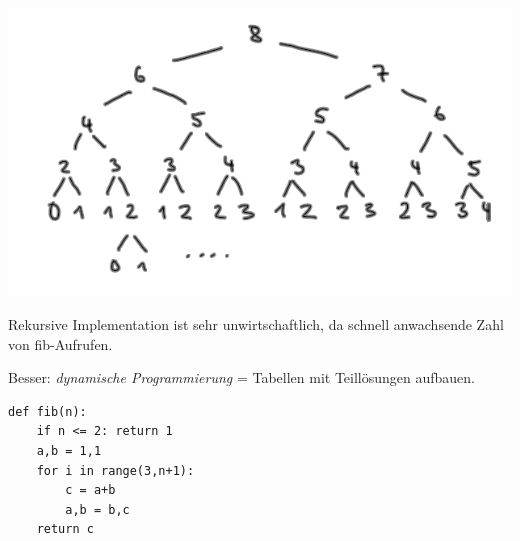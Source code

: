 \documentclass{beamer}
\begin{document}
\begin{frame}[fragile]

\includegraphics[scale=0.7]{fib.png} 

Rekursive Implementation ist sehr unwirtschaftlich, da schnell anwachsende Zahl von fib-Aufrufen.

\end{frame}

\begin{frame}[fragile]
Besser: \textit{dynamische Programmierung} = Tabellen mit Teillösungen aufbauen. \pause

\begin{lstlisting} 
def fib(n):
    if n <= 2: return 1
    a,b = 1,1
    for i in range(3,n+1):
        c = a+b
        a,b = b,c
    return c
\end{lstlisting} 

\end{frame}
\end{document}
